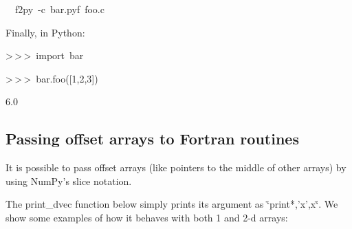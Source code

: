 \begin{lyxcode}
~~f2py~-c~bar.pyf~foo.c
\end{lyxcode}
Finally, in Python:

\begin{lyxcode}
>\,{}>\,{}>~import~bar

>\,{}>\,{}>~bar.foo({[}1,2,3])

6.0
\end{lyxcode}

\subsection{Passing offset arrays to Fortran routines}

It is possible to pass offset arrays (like pointers to the middle
of other arrays) by using NumPy's slice notation.

The print\_dvec function below simply prints its argument as \char`\"{}print{*},'x',x\char`\"{}.
We show some examples of how it behaves with both 1 and 2-d arrays: 

